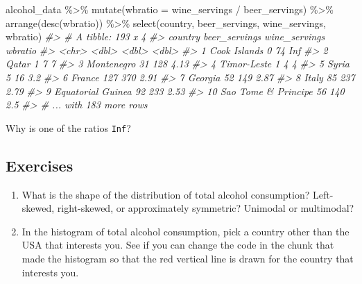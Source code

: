 \documentclass[
]{book}
\newenvironment{Shaded}{\begin{snugshade}}{\end{snugshade}}
\newcommand{\AttributeTok}[1]{\textcolor[rgb]{0.77,0.63,0.00}{#1}}
\newcommand{\CommentTok}[1]{\textcolor[rgb]{0.56,0.35,0.01}{\textit{#1}}}
\newcommand{\FunctionTok}[1]{\textcolor[rgb]{0.00,0.00,0.00}{#1}}
\newcommand{\NormalTok}[1]{#1}
\newcommand{\SpecialCharTok}[1]{\textcolor[rgb]{0.00,0.00,0.00}{#1}}
\begin{document}
\begin{Shaded}
\begin{Highlighting}[]
\NormalTok{alcohol\_data }\SpecialCharTok{\%\textgreater{}\%}
  \FunctionTok{mutate}\NormalTok{(}\AttributeTok{wbratio =}\NormalTok{ wine\_servings }\SpecialCharTok{/}\NormalTok{ beer\_servings) }\SpecialCharTok{\%\textgreater{}\%}
  \FunctionTok{arrange}\NormalTok{(}\FunctionTok{desc}\NormalTok{(wbratio)) }\SpecialCharTok{\%\textgreater{}\%}
  \FunctionTok{select}\NormalTok{(country, beer\_servings, wine\_servings, wbratio)}
\CommentTok{\#\textgreater{} \# A tibble: 193 x 4}
\CommentTok{\#\textgreater{}    country             beer\_servings wine\_servings wbratio}
\CommentTok{\#\textgreater{}    \textless{}chr\textgreater{}                       \textless{}dbl\textgreater{}         \textless{}dbl\textgreater{}   \textless{}dbl\textgreater{}}
\CommentTok{\#\textgreater{}  1 Cook Islands                    0            74  Inf   }
\CommentTok{\#\textgreater{}  2 Qatar                           1             7    7   }
\CommentTok{\#\textgreater{}  3 Montenegro                     31           128    4.13}
\CommentTok{\#\textgreater{}  4 Timor{-}Leste                     1             4    4   }
\CommentTok{\#\textgreater{}  5 Syria                           5            16    3.2 }
\CommentTok{\#\textgreater{}  6 France                        127           370    2.91}
\CommentTok{\#\textgreater{}  7 Georgia                        52           149    2.87}
\CommentTok{\#\textgreater{}  8 Italy                          85           237    2.79}
\CommentTok{\#\textgreater{}  9 Equatorial Guinea              92           233    2.53}
\CommentTok{\#\textgreater{} 10 Sao Tome \& Principe            56           140    2.5 }
\CommentTok{\#\textgreater{} \# ... with 183 more rows}
\end{Highlighting}
\end{Shaded}

Why is one of the ratios \texttt{Inf}?

\hypertarget{exercise-1-1}{%
\subsection{Exercises}\label{exercise-1-1}}

\begin{enumerate}
\def\labelenumi{\arabic{enumi}.}
\item
  What is the shape of the distribution of total alcohol consumption? Left-skewed, right-skewed, or approximately symmetric? Unimodal or multimodal?
\item
  In the histogram of total alcohol consumption, pick a country other than the USA that interests you. See if you can change the code in the chunk that made the histogram so that the red vertical line is drawn for the country that interests you.
\end{enumerate}
\end{document}
